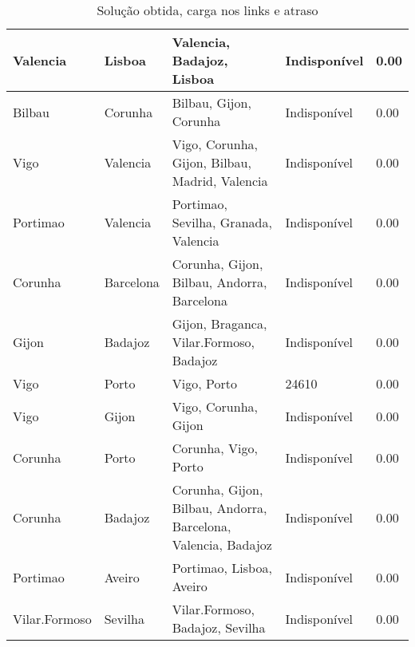 \begin{table}[!htb]
{\begin{tabular}{|l|l|l|l|l|}
Valencia & Lisboa & Valencia, Badajoz, Lisboa & Indisponível & 0.00 \\ \hline
Bilbau & Corunha & Bilbau, Gijon, Corunha & Indisponível & 0.00 \\ \hline
Vigo & Valencia & Vigo, Corunha, Gijon, Bilbau, Madrid, Valencia & Indisponível & 0.00 \\ \hline
Portimao & Valencia & Portimao, Sevilha, Granada, Valencia & Indisponível & 0.00 \\ \hline
Corunha & Barcelona & Corunha, Gijon, Bilbau, Andorra, Barcelona & Indisponível & 0.00 \\ \hline
Gijon & Badajoz & Gijon, Braganca, Vilar.Formoso, Badajoz & Indisponível & 0.00 \\ \hline
Vigo & Porto & Vigo, Porto & 24610 & 0.00 \\ \hline
Vigo & Gijon & Vigo, Corunha, Gijon & Indisponível & 0.00 \\ \hline
Corunha & Porto & Corunha, Vigo, Porto & Indisponível & 0.00 \\ \hline
Corunha & Badajoz & Corunha, Gijon, Bilbau, Andorra, Barcelona, Valencia, Badajoz & Indisponível & 0.00 \\ \hline
Portimao & Aveiro & Portimao, Lisboa, Aveiro & Indisponível & 0.00 \\ \hline
Vilar.Formoso & Sevilha & Vilar.Formoso, Badajoz, Sevilha & Indisponível & 0.00 \\ \hline
\end{tabular}}
\caption[]{Solução obtida, carga nos links e atraso}
\end{table}

